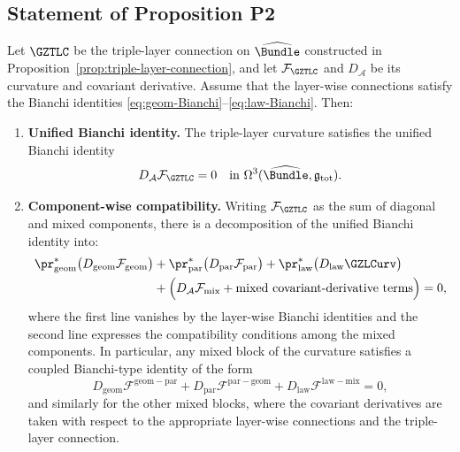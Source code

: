 \documentclass[11pt]{book}
\theoremstyle{plain}
\theoremstyle{definition}
\begin{document}
\subsection*{Statement of Proposition P2}


\begin{proposition}
\label{prop:P2-Bianchi-compatibility}
Let \(\GZTLC\) be the triple-layer connection on \(\widehat{\Bundle}\)
constructed in Proposition~\ref{prop:triple-layer-connection}, and let
\(\mathcal{F}_{\GZTLC}\) and \(D_{\mathcal{A}}\) be its curvature and
covariant derivative.  Assume that the layer-wise connections satisfy
the Bianchi identities \eqref{eq:geom-Bianchi}–\eqref{eq:law-Bianchi}.
Then:

\begin{enumerate}
  \item[\textnormal{(1)}] \textbf{Unified Bianchi identity.}
    The triple-layer curvature satisfies the unified Bianchi identity
    \[
      D_{\mathcal{A}}\mathcal{F}_{\GZTLC} = 0
      \quad\text{in }
      \Omega^3(\widehat{\Bundle},\mathfrak{g}_{\mathrm{tot}}).
    \]
  \item[\textnormal{(2)}] \textbf{Component-wise compatibility.}
    Writing \(\mathcal{F}_{\GZTLC}\) as the sum of diagonal and mixed
    components, there is a decomposition of the unified Bianchi
    identity into:
    \begin{align*}
      \pr_{\mathrm{geom}}^*\bigl(D_{\mathrm{geom}}
        \mathcal{F}_{\mathrm{geom}}\bigr)
      &+
      \pr_{\mathrm{par}}^*\bigl(D_{\mathrm{par}}
        \mathcal{F}_{\mathrm{par}}\bigr)
      +
      \pr_{\mathrm{law}}^*\bigl(D_{\mathrm{law}}
        \GZLCurv\bigr) \\
      &+
      \Bigl(
        D_{\mathcal{A}}\mathcal{F}_{\mathrm{mix}}
        + \text{mixed covariant-derivative terms}
      \Bigr)
      = 0,
    \end{align*}
    where the first line vanishes by the layer-wise Bianchi identities
    and the second line expresses the compatibility conditions among
    the mixed components.  In particular, any mixed block of the
    curvature satisfies a coupled Bianchi-type identity of the form
    \[
      D_{\mathrm{geom}}\mathcal{F}^{\mathrm{geom-par}}
      +
      D_{\mathrm{par}}\mathcal{F}^{\mathrm{par-geom}}
      +
      D_{\mathrm{law}}\mathcal{F}^{\mathrm{law-mix}}
      = 0,
    \]
    and similarly for the other mixed blocks, where the covariant
    derivatives are taken with respect to the appropriate layer-wise
    connections and the triple-layer connection.
\end{enumerate}
\end{proposition}
\end{document}
